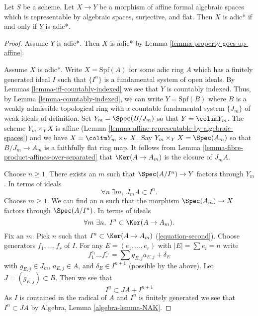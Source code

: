 \begin{lemma}
\label{lemma-iff-adic-star}
Let $S$ be a scheme. Let $X \to Y$ be a morphism of affine
formal algebraic spaces which is representable by algebraic spaces,
surjective, and flat. Then $X$ is adic* if and only if $Y$ is adic*.
\end{lemma}

\begin{proof}
Assume $Y$ is adic*. Then $X$ is adic* by
Lemma \ref{lemma-property-goes-up-affine}.

\medskip\noindent
Assume $X$ is adic*. Write $X = \text{Spf}(A)$ for some adic ring $A$
which has a finitely generated ideal $I$ such that $\{I^n\}$ is a
fundamental system of open ideals. By Lemmas \ref{lemma-iff-countably-indexed}
we see that $Y$ is countably indexed. Thus, by
Lemma \ref{lemma-countably-indexed},
we can write $Y = \text{Spf}(B)$ where $B$ is a weakly admissible
topological ring with a countable fundamental system $\{J_m\}$ of
weak ideals of definition. Set $Y_m = \Spec(B/J_m)$ so that
$Y = \colim Y_m$. The scheme $Y_m \times_Y X$ is affine
(Lemma \ref{lemma-affine-representable-by-algebraic-spaces})
and we have $X = \colim Y_m \times_Y X$. Say $Y_m \times_Y X = \Spec(A_m)$
so that $B/J_m \to A_m$ is a faithfully flat ring map.
It follows from Lemma \ref{lemma-fibre-product-affines-over-separated}
that $\Ker(A \to A_m)$ is the closure of $J_mA$.

\medskip\noindent
Choose $n \geq 1$. There exists an $m$ such that $\Spec(A/I^n) \to Y$
factors through $Y_m$. In terms of ideals
\begin{equation}
\label{equation-first}
\forall n\ \exists m,\ J_m A \subset I^n.
\end{equation}
Choose $m \geq 1$. We can find an $n$ such that the morphism
$\Spec(A_m) \to X$ factors through $\Spec(A/I^n)$. In terms of ideals
\begin{equation}
\label{equation-second}
\forall m\ \exists n,\ I^n \subset \Ker(A \to A_m).
\end{equation}
Fix an $m$. Pick $n$ such that $I^n \subset \Ker(A \to A_m)$
(\ref{equation-second}). Choose generators $f_1, \ldots, f_r$
of $I$. For any $E = (e_1, \ldots, e_r)$ with $|E| = \sum e_i = n$ write
$$
f_1^{e_1} \ldots f_r^{e_r} =
\sum g_{E, j} a_{E, j} + \delta_E
$$
with $g_{E, j} \in J_m$, $a_{E, j} \in A$, and $\delta_E \in I^{n + 1}$
(possible by the above). Let $J = (g_{E, j}) \subset B$.
Then we see that
$$
I^n \subset J A + I^{n + 1}
$$
As $I$ is contained in the radical of $A$ and $I^n$ is finitely generated
we see that $I^n \subset JA$ by Algebra, Lemma \ref{algebra-lemma-NAK}.


\end{proof}
